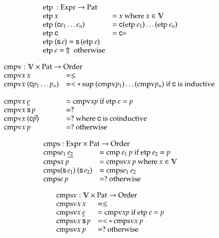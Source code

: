 \[
\begin{array}[t]{ll}
\multicolumn{2}{l}{\etp : \Expr \ra \Pat}\\ 
\etp x & = x \mbox{ where } x \in \cV \\
\etp (\cc e_1 \ldots e_n ) & = \cc (\etp e_1) \ldots (\etp e_n) \\
\etp \cc  & = \cc \diamond \\
\etp (\s e) = \s (\etp e) \\
\etp e = \stuck \mbox{ otherwise}
\end{array}
\]

\[
\begin{array}[t]{ll}
\multicolumn{2}{l}{\cmpv : \cV \times \Pat \ra \order}\\ 
\cmpv x \: x & = \leq \\
\cmpv x \: (\cc p_1 \ldots p_n ) & = < * \: \supo (\cmpv p_1) \ldots (\cmpv p_n) \mbox{ if } \cc \mbox{ is inductive }\\   \\
\cmpv x \: \inacc{e} & = \cmpv x p \mbox{ if } \etp e = p \\
\cmpv x \: \s p & = ? \\
\cmpv x \: (\cc \vec{p}) & = ? \mbox{ where } \cc \mbox{ is coinductive}\\
\cmpv x \: p & = ? \mbox{ otherwise}
\end{array}
\]

\[
\begin{array}[t]{ll}
\multicolumn{2}{l}{\cmps : \Expr \times \Pat \ra \order}\\ 
\cmps e_1 \: \inacc{e_2} & = \cmp e_1 \: p \mbox{ if } \etp e_2 = p \\
\cmps x \: p & = \cmpsv x \:p  \mbox{ where } x \in \cV \\
\cmps (\s e_1) \: (\s e_2) & = \cmps e_1 \: e_2 \\
\cmps e \: p & = ? \mbox{ otherwise}
\end{array}
\]

\[
\begin{array}[t]{ll}
\multicolumn{2}{l}{\cmpsv : \cV \times \Pat \ra \order}\\ 
\cmpsv x \: x & = \leq \\
\cmpsv x \: \inacc{e} & = \cmpv x p \mbox{ if } \etp e = p \\
\cmpsv x \: \s p & = < * \: \cmpsv x \: p \\
\cmpsv x \: p & = ? \mbox{ otherwise}
\end{array}
\]

